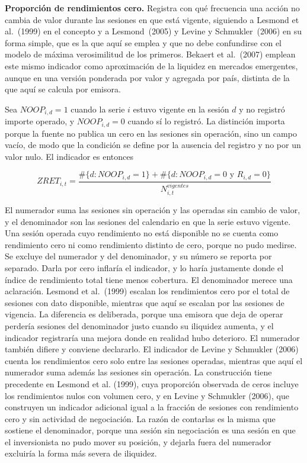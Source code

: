 \textbf{Proporción de rendimientos cero.} Registra con qué frecuencia una acción no cambia de valor durante las sesiones en que está vigente, siguiendo a Lesmond et al.~(1999) en el concepto y a Lesmond~(2005) y Levine y Schmukler~(2006) en su forma simple, que es la que aquí se emplea y que no debe confundirse con el modelo de máxima verosimilitud de los primeros. Bekaert et al.~(2007) emplean este mismo indicador como aproximación de la liquidez en mercados emergentes, aunque en una versión ponderada por valor y agregada por país, distinta de la que aquí se calcula por emisora.


Sea $NOOP_{i,d} = 1$ cuando la serie $i$ estuvo vigente en la sesión $d$ y no registró importe operado, y $NOOP_{i,d} = 0$ cuando sí lo registró. La distinción importa porque la fuente no publica un cero en las sesiones sin operación, sino un campo vacío, de modo que la condición se define por la ausencia del registro y no por un valor nulo. El indicador es entonces

\begin{equation}ZRET_{i,t} = \frac{\#\{ d:NOOP_{i,d} = 1\} + \#\{ d:NOOP_{i,d} = 0\text{ y }R_{i,d} = 0\}}{N_{i,t}^{vigentes}}\tag{8}\end{equation}

El numerador suma las sesiones sin operación y las operadas sin cambio de valor, y el denominador son las sesiones del calendario en que la serie estuvo vigente. Una sesión operada cuyo rendimiento no está disponible no se cuenta como rendimiento cero ni como rendimiento distinto de cero, porque no pudo medirse. Se excluye del numerador y del denominador, y su número se reporta por separado. Darla por cero inflaría el indicador, y lo haría justamente donde el índice de rendimiento total tiene menos cobertura. El denominador merece una aclaración. Lesmond et al.~(1999) escalan los rendimientos cero por el total de sesiones con dato disponible, mientras que aquí se escalan por las sesiones de vigencia. La diferencia es deliberada, porque una emisora que deja de operar perdería sesiones del denominador justo cuando su iliquidez aumenta, y el indicador registraría una mejora donde en realidad hubo deterioro. El numerador también difiere y conviene declararlo. El indicador de Levine y Schmukler (2006) cuenta los rendimientos cero solo entre las sesiones operadas, mientras que aquí el numerador suma además las sesiones sin operación. La construcción tiene precedente en Lesmond et al. (1999), cuya proporción observada de ceros incluye los rendimientos nulos con volumen cero, y en Levine y Schmukler (2006), que construyen un indicador adicional igual a la fracción de sesiones con rendimiento cero y sin actividad de negociación. La razón de contarlas es la misma que sostiene el denominador, porque una sesión sin negociación es una sesión en que el inversionista no pudo mover su posición, y dejarla fuera del numerador excluiría la forma más severa de iliquidez.

